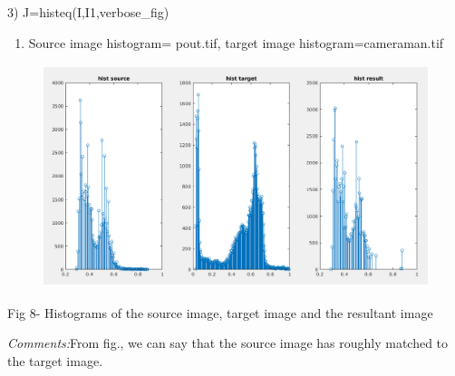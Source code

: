\documentclass[12pt]{article}
\begin{document}
\vspace{\baselineskip}
\begin{justify}
3) J=histeq(I,I1,verbose\_fig)
\end{justify}\par

\begin{enumerate}
	\item Source image histogram= pout.tif, target image histogram=cameraman.tif
\end{enumerate}\par

\tab 
\vspace{\baselineskip}


\begin{figure}[H]
	\begin{Center}
		\includegraphics[width=4.51in,height=2.56in]{./media/image19.png}
	\end{Center}
\end{figure}



\par

\begin{Center}
Fig 8- Histograms of the source image, target image and the resultant image
\end{Center}\par


\vspace{\baselineskip}
\begin{adjustwidth}{1.0in}{0.0in}
\begin{justify}
\textit{Comments:}From fig., we can say that the source image has roughly matched to the target image.
\end{justify}\par

\end{adjustwidth}
\end{document}

